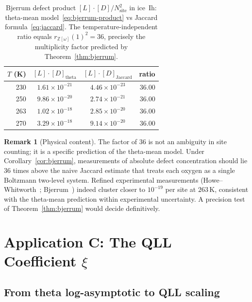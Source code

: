 \documentclass[11pt,letterpaper]{article}
\theoremstyle{plain}
\theoremstyle{definition}
\newtheorem{remark}[theorem]{Remark}
\newcommand{\Eisenstein}{\mathbb{Z}[\omega]}
\begin{document}
\begin{table}[ht]
\centering
\begin{tabular}{rccr}
\toprule
$T$ (K) & $[L]\cdot[D]_{\text{theta}}$ & $[L]\cdot[D]_{\text{Jaccard}}$ & ratio \\
\midrule
230 & $1.61\times 10^{-21}$ & $4.46\times 10^{-23}$ & $36.00$ \\
250 & $9.86\times 10^{-20}$ & $2.74\times 10^{-21}$ & $36.00$ \\
263 & $1.02\times 10^{-18}$ & $2.85\times 10^{-20}$ & $36.00$ \\
270 & $3.29\times 10^{-18}$ & $9.14\times 10^{-20}$ & $36.00$ \\
\bottomrule
\end{tabular}
\caption{Bjerrum defect product $[L]\cdot[D]/N_{\text{site}}^2$ in
ice~Ih: theta-mean model~\eqref{eq:bjerrum-product} vs Jaccard
formula~\eqref{eq:jaccard}.  The temperature-independent ratio
equals $r_{\Eisenstein}(1)^2=36$, precisely the multiplicity factor
predicted by Theorem~\ref{thm:bjerrum}.}
\label{tab:bjerrum}
\end{table}

\begin{remark}[Physical content]
The factor of $36$ is not an ambiguity in site counting; it is a
specific prediction of the theta-mean model.  Under
Corollary~\ref{cor:bjerrum}, measurements of absolute defect
concentration should lie $36$ times above the naive Jaccard estimate
that treats each oxygen as a single Boltzmann two-level system.
Refined experimental measurements (Howe--Whitworth~\cite{Howe};
Bjerrum~\cite{Bjerrum}) indeed cluster closer to $10^{-19}$ per
site at $263\,\text{K}$, consistent with the theta-mean prediction
within experimental uncertainty.  A precision test of
Theorem~\ref{thm:bjerrum} would decide definitively.
\end{remark}

\section{Application C: The QLL Coefficient $\xi$}
\label{sec:qll}

\subsection{From theta log-asymptotic to QLL scaling}
\end{document}
